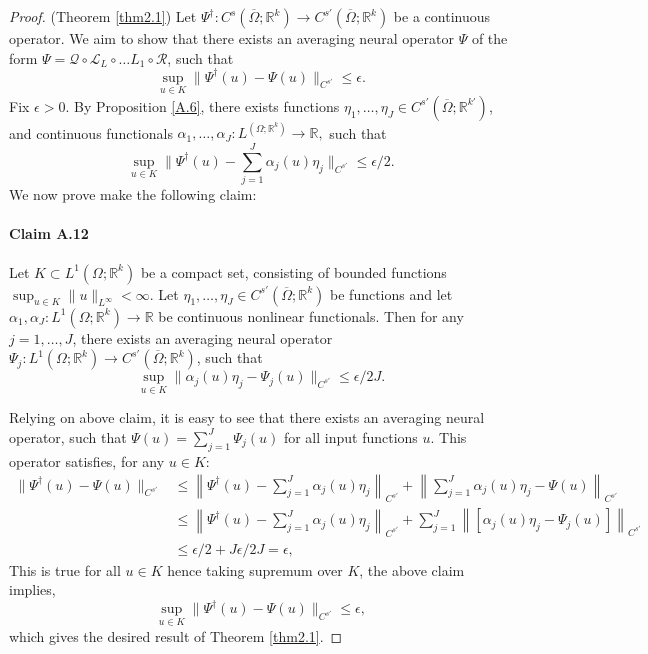 \documentclass[reqno]{amsart}
\theoremstyle{plain}
\theoremstyle{definition}
\newcommand{\bb}[1]{\mathbb{#1}}
\newcommand{\cal}[1]{\mathcal{#1}}
\begin{document}
\begin{proof}{(Theorem \ref{thm2.1})}
    Let $\Psi^\dag : C^s(\overline{\Omega};\bb R^k) \to C^{s'}(\overline{\Omega};\bb R^k)$ be a continuous operator. We aim to show that there exists an averaging neural operator $\Psi$ of the form $\Psi = \cal Q \circ \cal L_L \circ \dots L_1 \circ \cal R$, such that
    $$ \sup_{u \in K} \|\Psi^\dag(u) - \Psi(u)\|_{C^{s'}} \leq \epsilon.$$
    Fix $\epsilon > 0$. By Proposition \ref{A.6}, there exists functions $\eta_1, \dots, \eta_J \in C^{s'}(\overline{\Omega};\bb R^{k'})$, and continuous functionals $\alpha_1, \dots, \alpha_J : L^(\Omega; \bb R^k) \to \bb R,$ such that
    $$ \sup_{u \in K}\|\Psi^\dag(u) - \sum_{j=1}^{J}\alpha_j(u)\eta_j\|_{C^{s'}} \leq \epsilon/2.$$
    We now prove make the following claim:
    \paragraph{\bf Claim A.12 \label{claim1}} Let $K \subset L^1(\Omega; \bb R^k)$ be a compact set, consisting of bounded functions $\sup_{u \in K}\|u\|_{L^\infty} < \infty$. Let $\eta_1, \dots, \eta_J \in C^{s'}(\overline{\Omega};\bb R^k)$ be functions and let $\alpha_1, \alpha_J : L^1(\Omega; \bb R^k) \to \bb R$ be continuous nonlinear functionals. Then for any $j = 1, \dots, J$, there exists an averaging neural operator $\Psi_j : L^1(\Omega; \bb R^k) \to C^{s'}(\overline{\Omega};\bb R^k)$, such that
    $$\sup_{u\in K}\|\alpha_j(u)\eta_j - \Psi_j(u)\|_{C^{s'}} \leq \epsilon/2J.$$
    
    \noindent Relying on above claim, it is easy to see that there exists an averaging neural operator, such that $\Psi(u) = \sum_{j=1}^{J} \Psi_j(u)$ for all input functions $u$. This operator satisfies, for any $u \in K$:
    $$
    \begin{aligned}
        \|\Psi^\dag(u) - \Psi(u)\|_{C^{s'}} &\leq \left\|\Psi^\dag(u) - \sum\nolimits_{j=1}^{J} \alpha_j(u) \eta_j\right\|_{C^{s'}} + \left\|\sum\nolimits_{j=1}^{J}\alpha_j(u)\eta_j - \Psi(u)\right\|_{C^{s'}}\\
        &\leq \left\|\Psi^\dag(u) - \sum\nolimits_{j=1}^{J} \alpha_j(u) \eta_j\right\|_{C^{s'}} + \sum\nolimits_{j=1}^{J}\left\|[\alpha_j(u)\eta_j - \Psi_j(u)]\right\|_{C^{s'}}\\
        &\leq \epsilon/2 + J\epsilon/2J = \epsilon,
    \end{aligned}
    $$
    This is true for all $u \in K$ hence taking supremum over $K$, the above claim implies,
    $$ \sup_{u \in K} \|\Psi^\dag(u) - \Psi(u)\|_{C^{s'}} \leq \epsilon,$$
    which gives the desired result of Theorem \ref{thm2.1}.


\end{proof}
\end{document}
